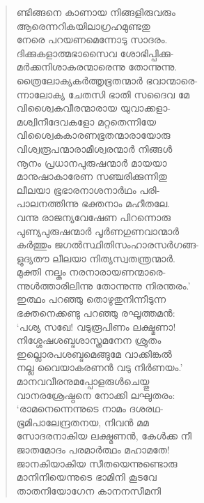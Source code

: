 \begin{verse}
ണ്ടിങ്ങനെ കാണായ നിങ്ങളിരുവരും\\
ആരെന്നറികയിലാഗ്രഹമുണ്ടതു\\
നേരെ പറയണമെന്നോടു സാദരം.\\
ദിക്കുകളാത്മഭാസൈവ ശോഭിപ്പിക്കു-\\
മര്‍ക്കനിശാകരന്മാരെന്നു തോന്നുന്നു.\\
ത്രൈലോക്യകര്‍ത്തൃഭൂതന്മാര്‍ ഭവാന്മാരെ-\\
ന്നാലോക്യ ചേതസി ഭാതി സദൈവ മേ\\
വിശ്വൈകവീരന്മാരായ യുവാക്കളാ-\\
മശ്വിനീദേവകളോ മറ്റതെന്നിയേ\\
വിശ്വൈകകാരണഭൂതന്മാരായോരു\\
വിശ്വരൂപന്മാരാമീശ്വരന്മാര്‍ നിങ്ങള്‍\\
നൂനം പ്രധാനപുരുഷന്മാര്‍ മായയാ\\
മാനുഷാകാരേണ സഞ്ചരിക്കുന്നിതു\\
ലീലയാ ഭൂഭാരനാശനാര്‍ഥം പരി-\\
പാലനത്തിന്നു ഭക്തനാം മഹീതലേ.\\
വന്നു രാജന്യവേഷേണ പിറന്നൊരു\\
പുണ്യപുരുഷന്മാര്‍ പൂര്‍ണഗുണവാന്മാര്‍\\
കര്‍ത്തും ജഗല്‍സ്ഥിതിസംഹാരസര്‍ഗങ്ങ-\\
ളുദ്യതൗ ലീലയാ നിത്യസ്വതന്ത്രന്മാര്‍.\\
മുക്തി നല്കും നരനാരായണന്മാരെ-\\
ന്നുള്‍ത്താരിലിന്നു തോന്നുന്നു നിരന്തരം.’\\
ഇത്ഥം പറഞ്ഞു തൊഴുതുനിന്നീടുന്ന\\
ഭക്തനെക്കണ്ടു പറഞ്ഞു രഘൂത്തമന്‍:\\
‘പശ്യ സഖേ! വടുരൂപിണം ലക്ഷ്മണാ!\\
നിശ്ശേഷശബ്ദശാസ്ത്രമനേന ശ്രുതം\\
ഇല്ലൊരപശബ്ദമെങ്ങുമേ വാക്കിങ്കല്‍\\
നല്ല വൈയാകരണന്‍ വടു നിര്‍ണയം.’\\
മാനവവീരനുമപ്പോളരുള്‍ചെയ്തു\\
വാനരശ്രേഷ്ഠനെ നോക്കി ലഘുതരം:\\
‘രാമനെന്നെന്നുടെ നാമം ദശരഥ-\\
ഭൂമിപാലേന്ദ്രതനയ, നിവന്‍ മമ\\
സോദരനാകിയ ലക്ഷ്മണന്‍, കേള്‍ക്ക നീ\\
ജാതമോദം പരമാര്‍ത്ഥം മഹാമതേ!\\
ജാനകിയാകിയ സീതയെന്നുണ്ടൊരു\\
മാനിനിയെന്നുടെ ഭാമിനി കൂടവേ\\
താതനിയോഗേന കാനനസീമനി\\

\end{verse}
